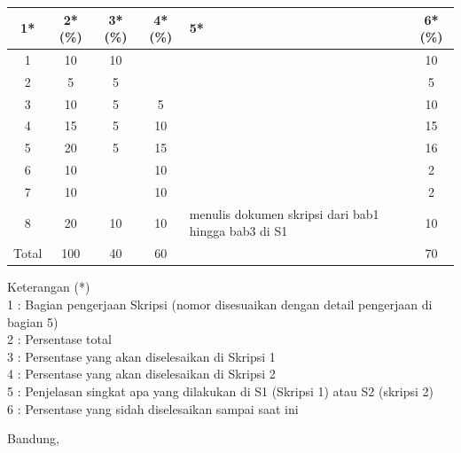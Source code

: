 \documentclass[a4paper,twoside]{article}
\begin{document}
\begin{center}
  \begin{tabular}{ | c | c | c | c | l | c |}
    \hline
    1*  & 2*(\%) & 3*(\%) & 4*(\%) &5* &6*(\%)\\ \hline \hline
    1   & 10  & 10  &  &  & 10 \\ \hline
    2   & 5 & 5  &   &  &  5\\ \hline
    3   & 10  & 5  & 5 &  & 10 \\ \hline
    4   & 15  & 5  &  10 & & 15 \\ \hline
    5   & 20  & 5  & 15 & & 16 \\ \hline
    6   & 10 &   & 10  &  & 2 \\\hline
    7   & 10  &   & 10 &  & 2 \\ \hline
    8   & 20  & 10 & 10  & {\footnotesize menulis dokumen skripsi dari bab1 hingga bab3 di S1}  & 10\\ \hline
    Total  & 100  & 40  & 60 &  & 70\\ \hline
                          \end{tabular}
\end{center}

Keterangan (*)\\
1 : Bagian pengerjaan Skripsi (nomor disesuaikan dengan detail pengerjaan di bagian 5)\\
2 : Persentase total \\
3 : Persentase yang akan diselesaikan di Skripsi 1 \\
4 : Persentase yang akan diselesaikan di Skripsi 2 \\
5 : Penjelasan singkat apa yang dilakukan di S1 (Skripsi 1) atau S2 (skripsi 2)\\
6 : Persentase yang sidah diselesaikan sampai saat ini 

\vspace{1cm}
\centering Bandung, \tanggal\\
\vspace{2cm} \nama \\ 
\vspace{1cm}
\end{document}
